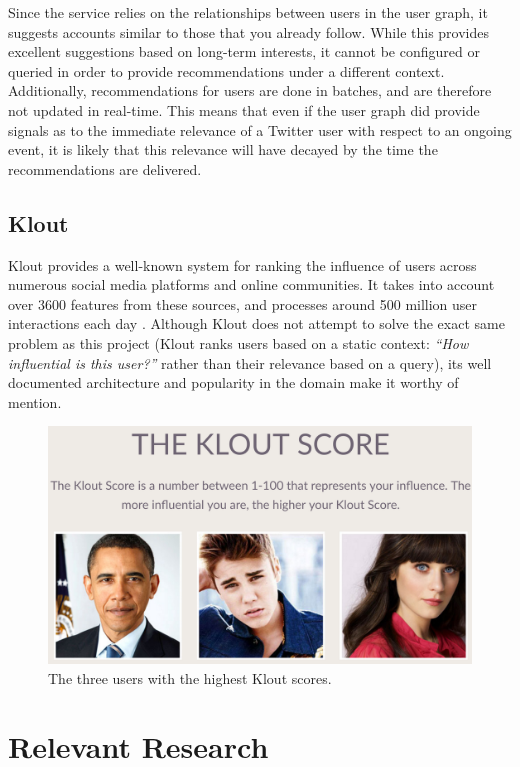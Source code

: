 \documentclass{l4proj}
\begin{document}
Since the service relies on the relationships between users in the user graph, it suggests accounts similar to those that you already follow. While this provides excellent suggestions based on long-term interests, it cannot be configured or queried in order to provide recommendations under a different context. Additionally, recommendations for users are done in batches, and are therefore not updated in real-time. This means that even if the user graph did provide signals as to the immediate relevance of a Twitter user with respect to an ongoing event, it is likely that this relevance will have decayed by the time the recommendations are delivered.

\subsection{Klout}
Klout provides a well-known system for ranking the influence of users across numerous social media platforms and online communities. It takes into account over 3600 features from these sources, and processes around 500 million user interactions each day \cite{klout}. Although Klout does not attempt to solve the exact same problem as this project (Klout ranks users based on a static context: \textit{``How influential is this user?''} rather than their relevance based on a query), its well documented architecture and popularity in the domain make it worthy of mention.

\begin{figure}[H]
\centering
\includegraphics[scale=0.3]{klout.png}
\caption{The three users with the highest Klout scores.}
\label{kloutimage}
\end{figure}

\section{Relevant Research}
\end{document}
